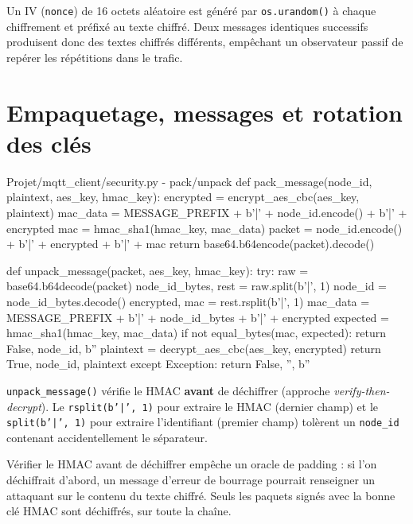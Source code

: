 \documentclass[a4paper,11pt]{report}
\begin{document}
Un IV (\texttt{nonce}) de 16 octets aléatoire est généré par \texttt{os.urandom()} à chaque chiffrement
et préfixé au texte chiffré. Deux messages identiques successifs produisent donc des textes chiffrés
différents, empêchant un observateur passif de repérer les répétitions dans le trafic.

\section{Empaquetage, messages et rotation des clés}

\begin{pycode}{Projet/mqtt\_client/security.py - pack/unpack}
def pack_message(node_id, plaintext, aes_key, hmac_key):
    encrypted = encrypt_aes_cbc(aes_key, plaintext)
    mac_data = MESSAGE_PREFIX + b'|' + node_id.encode() + b'|' + encrypted
    mac = hmac_sha1(hmac_key, mac_data)
    packet = node_id.encode() + b'|' + encrypted + b'|' + mac
    return base64.b64encode(packet).decode()

def unpack_message(packet, aes_key, hmac_key):
    try:
        raw = base64.b64decode(packet)
        node_id_bytes, rest = raw.split(b'|', 1)
        node_id = node_id_bytes.decode()
        encrypted, mac = rest.rsplit(b'|', 1)
        mac_data = MESSAGE_PREFIX + b'|' + node_id_bytes + b'|' + encrypted
        expected = hmac_sha1(hmac_key, mac_data)
        if not equal_bytes(mac, expected):
            return False, node_id, b''
        plaintext = decrypt_aes_cbc(aes_key, encrypted)
        return True, node_id, plaintext
    except Exception:
        return False, '', b''
\end{pycode}

\texttt{unpack\_message()} vérifie le HMAC \textbf{avant} de déchiffrer (approche \emph{verify-then-decrypt}).
Le \texttt{rsplit(b'|', 1)} pour extraire le HMAC (dernier champ) et le \texttt{split(b'|', 1)} pour
extraire l'identifiant (premier champ) tolèrent un \texttt{node\_id} contenant accidentellement le séparateur.

\begin{validation}
Vérifier le HMAC avant de déchiffrer empêche un oracle de padding : si l'on déchiffrait d'abord, un
message d'erreur de bourrage pourrait renseigner un attaquant sur le contenu du texte chiffré. Seuls les
paquets signés avec la bonne clé HMAC sont déchiffrés, sur toute la chaîne.
\end{validation}
\end{document}
